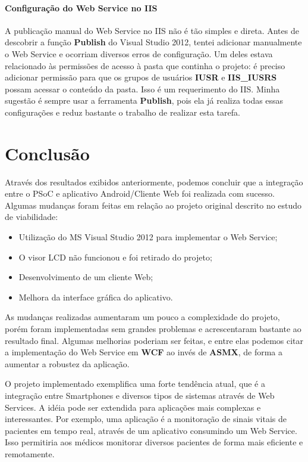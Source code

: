 \documentclass[a4paper,12pt,titlepage]{article}
\begin{document}
	\paragraph{Configuração do Web Service no IIS}	
	A publicação manual do Web Service no IIS não é tão simples e direta. Antes de descobrir a função \textbf{Publish} do Visual Studio 2012, tentei adicionar manualmente o Web Service e ocorriam diversos erros de configuração. Um deles estava relacionado às permissões de acesso à pasta que continha o projeto: é preciso adicionar permissão para que os grupos de usuários \textbf{IUSR} e \textbf{IIS\_IUSRS} possam acessar o conteúdo da pasta. Isso é um requerimento do IIS. Minha sugestão é sempre usar a ferramenta \textbf{Publish}, pois ela já realiza todas essas configurações e reduz bastante o trabalho de realizar esta tarefa. 
	
	 
	
\section{Conclusão}
	Através dos resultados exibidos anteriormente, podemos concluir que a integração entre o PSoC e aplicativo Android/Cliente Web foi realizada com sucesso. Algumas mudanças foram feitas em relação ao projeto original descrito no estudo de viabilidade:
	\begin{itemize}
		\item Utilização do MS Visual Studio 2012 para implementar o Web Service;
		\item O visor LCD não funcionou e foi retirado do projeto;
		\item Desenvolvimento de um cliente Web;
		\item Melhora da interface gráfica do aplicativo.
	\end{itemize}
	
	As mudanças realizadas aumentaram um pouco a complexidade do projeto, porém foram implementadas sem grandes problemas e acrescentaram bastante ao resultado final. Algumas melhorias poderiam ser feitas, e entre elas podemos citar a implementação do Web Service em \textbf{WCF} ao invés de \textbf{ASMX}, de forma a aumentar a robustez da aplicação.
	
	O projeto implementado exemplifica uma forte tendência atual, que é a integração entre Smartphones e diversos tipos de sistemas através de Web Services. A idéia pode ser extendida para aplicações mais complexas e interessantes. Por exemplo, uma aplicação é a monitoração de sinais vitais de pacientes em tempo real, através de um aplicativo consumindo um Web Service. Isso permitiria aos médicos monitorar diversos pacientes de forma mais eficiente e remotamente.     
	
\newpage


\nocite{*}

\end{document}
